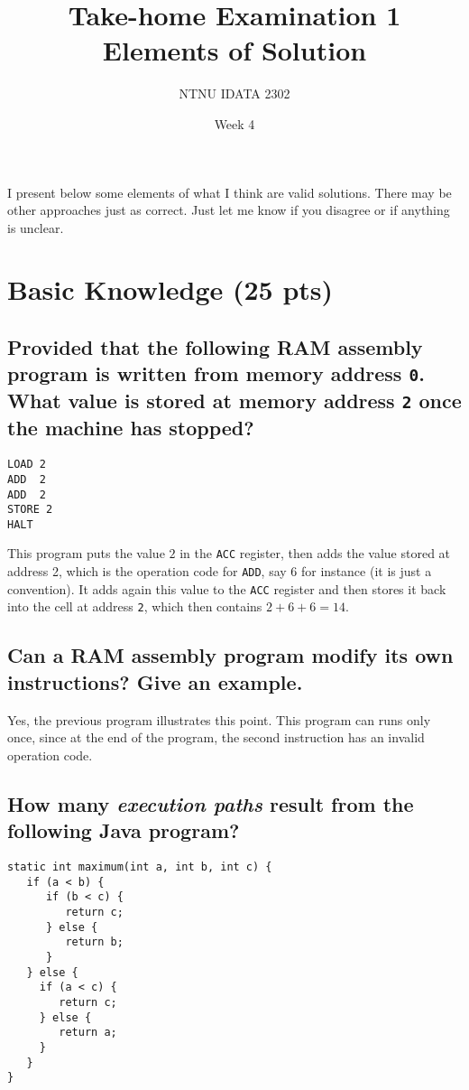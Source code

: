 \documentclass[11pt]{article}
\author{NTNU IDATA 2302}
\date{Week 4}
\title{Take-home Examination 1\\\medskip
\large Elements of Solution}
\begin{document}
\maketitle
I present below some elements of what I think are valid
solutions. There may be other approaches just as correct. Just let me
know if you disagree or if anything is unclear.


\section{Basic Knowledge (25 pts)}
\label{sec:org7fc2a3e}

\subsection{Provided that the following RAM assembly program is written from memory address \texttt{0}. What value is stored at memory address \texttt{2} once the machine has stopped?}
\label{sec:org4649746}
\begin{verbatim}
LOAD 2
ADD  2
ADD  2
STORE 2
HALT
\end{verbatim}

This program puts the value \(2\) in the \texttt{ACC} register, then adds
the value stored at address 2, which is the operation code for
\texttt{ADD}, say 6 for instance (it is just a convention). It adds
again this value to the \texttt{ACC} register and then stores it back
into the cell at address \texttt{2}, which then contains \(2+6+6=14\).


\subsection{Can a RAM assembly program modify its own instructions? Give an example.}
\label{sec:org58e8d33}

Yes, the previous program illustrates this point. This
program can runs only once, since at the end of the program, the
second instruction has an invalid operation code.

\subsection{How many \emph{execution paths} result from the following Java program?}
\label{sec:org69201a5}
\begin{verbatim}
static int maximum(int a, int b, int c) {
   if (a < b) {
      if (b < c) {
         return c;
      } else {
         return b;
      }
   } else {
     if (a < c) {
        return c;
     } else {
        return a;
     }
   }
}
\end{verbatim}
\end{document}
